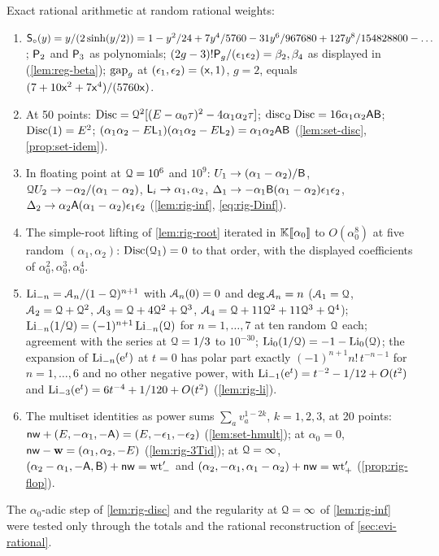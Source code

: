 Exact rational arithmetic at random rational weights:
\begin{enumerate}
\item[(A)] $\mathsf{S}_{\circ}(y)=y/(2\sinh(y/2))=1-y^2/24+7y^4/5760-31y^6/967680+127y^8/154828800-\dots$; $\mathsf{P}_{2}$ and $\mathsf{P}_{3}$ as polynomials; $(2g-3)!\mathsf{P}_{g}/(\epsilon_1\epsilon_2)=\beta_2,\beta_4$ as displayed in \cite{BS} (\cref{lem:reg-beta}); $\mathrm{gap}_g$ at $(\epsilon_1,\epsilon_2)=(\mathsf{x},1)$, $g=2$, equals $(7+10\mathsf{x}^2+7\mathsf{x}^4)/(5760\mathsf{x})$. 
\item[(B)] At 50 points: $\operatorname{Disc}=\mathcal{Q}^2[(E-\alpha_0\tau)^2-4\alpha_1\alpha_2\tau]$; $\mathrm{disc}_{\mathcal{Q}}\operatorname{Disc}=16\alpha_1\alpha_2\mathsf{A}\mathsf{B}$; $\operatorname{Disc}(1)=E^2$; $(\alpha_1\alpha_2-E\mathsf{L}_1)(\alpha_1\alpha_2-E\mathsf{L}_2)=\alpha_1\alpha_2\mathsf{A}\mathsf{B}$ (\cref{lem:set-disc}, \cref{prop:set-idem}).
\item[(C)] In floating point at $\mathcal{Q}=10^6$ and $10^9$: $U_1\to(\alpha_1-\alpha_2)/\mathsf{B}$, $\mathcal{Q} U_2\to-\alpha_2/(\alpha_1-\alpha_2)$, $\mathsf{L}_i\to\alpha_1,\alpha_2$, $\Delta_1\to-\alpha_1\mathsf{B}(\alpha_1-\alpha_2)\epsilon_1\epsilon_2$, $\Delta_2\to\alpha_2\mathsf{A}(\alpha_1-\alpha_2)\epsilon_1\epsilon_2$ (\cref{lem:rig-inf}, \eqref{eq:rig-Dinf}).
\item[(D)] The simple-root lifting of \cref{lem:rig-root} iterated in $\mathbb{K}[\![ \alpha_0 ]\!]$ to $O(\alpha_0^8)$ at five random $(\alpha_1,\alpha_2)$: $\operatorname{Disc}(\mathcal{Q}_1)=0$ to that order, with the displayed coefficients of $\alpha_0^2,\alpha_0^3,\alpha_0^4$.
\item[(E)] $\operatorname{Li}_{-n}=\mathcal{A}_n/(1-\mathcal{Q})^{n+1}$ with $\mathcal{A}_n(0)=0$ and $\deg\mathcal{A}_n=n$ ($\mathcal{A}_1=\mathcal{Q}$, $\mathcal{A}_2=\mathcal{Q}+\mathcal{Q}^2$, $\mathcal{A}_3=\mathcal{Q}+4\mathcal{Q}^2+\mathcal{Q}^3$, $\mathcal{A}_4=\mathcal{Q}+11\mathcal{Q}^2+11\mathcal{Q}^3+\mathcal{Q}^4$); $\operatorname{Li}_{-n}(1/\mathcal{Q})=(-1)^{n+1}\operatorname{Li}_{-n}(\mathcal{Q})$ for $n=1,\dots,7$ at ten random $\mathcal{Q}$ each; agreement with the series at $\mathcal{Q}=1/3$ to $10^{-30}$; $\operatorname{Li}_0(1/\mathcal{Q})=-1-\operatorname{Li}_0(\mathcal{Q})$; the expansion of $\operatorname{Li}_{-n}(\mathrm{e}^t)$ at $t=0$ has polar part exactly $(-1)^{n+1}n!\,t^{-n-1}$ for $n=1,\dots,6$ and no other negative power, with $\operatorname{Li}_{-1}(\mathrm{e}^t)=t^{-2}-1/12+O(t^2)$ and $\operatorname{Li}_{-3}(\mathrm{e}^t)=6t^{-4}+1/120+O(t^2)$ (\cref{lem:rig-li}).
\item[(F)] The multiset identities as power sums $\sum_av_a^{1-2k}$, $k=1,2,3$, at 20 points: $\mathsf{nw}+(E,-\alpha_1,-\mathsf{A})=(E,-\epsilon_1,-\epsilon_2)$ (\cref{lem:set-hmult}); at $\alpha_0=0$, $\mathsf{nw}-\mathbf{w}=(\alpha_1,\alpha_2,-E)$ (\cref{lem:rig-3Tid}); at $\mathcal{Q}=\infty$, $(\alpha_2-\alpha_1,-\mathsf{A},\mathsf{B})+\mathsf{nw}=\mathrm{wt}'_-$ and $(\alpha_2,-\alpha_1,\alpha_1-\alpha_2)+\mathsf{nw}=\mathrm{wt}'_+$ (\cref{prop:rig-flop}).
\end{enumerate}
The $\alpha_0$-adic step of \cref{lem:rig-disc} and the regularity at $\mathcal{Q}=\infty$ of \cref{lem:rig-inf} were tested only through the totals and the rational reconstruction of \cref{sec:evi-rational}.

